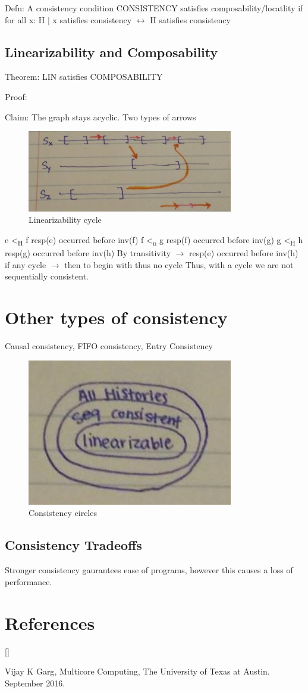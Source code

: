 \documentclass[twoside]{article}
\def\beginrefs{\begin{list}%
        {[\arabic{equation}]}{\usecounter{equation}
         \setlength{\leftmargin}{2.0truecm}\setlength{\labelsep}{0.4truecm}%
         \setlength{\labelwidth}{1.6truecm}}}
\def\endrefs{\end{list}}
\def\bibentry#1{\item[\hbox{[#1]}]}
\begin{document}
Defn: A consistency condition CONSISTENCY satisfies composability/locatlity if for all x: H $\vert$ x satisfies consistency $\longleftrightarrow$ H satisfies consistency

\subsection{Linearizability and Composability}

Theorem: LIN satisfies COMPOSABILITY

Proof: 

Claim: The graph stays acyclic. Two types of arrows
\begin{figure}[ht!]
\centering
\includegraphics[width=90mm]{pic_12.jpg}
\caption{Linearizability cycle \label{overflow}}
\end{figure}
e \textless\textsubscript{H} f resp(e) occurred before inv(f)
f \textless\textsubscript{n} g resp(f) occurred before inv(g)
g \textless\textsubscript{H} h resp(g) occurred before inv(h)
By transitivity $\rightarrow$ resp(e) occurred before inv(h)
if any cycle $\rightarrow$ then to begin with thus no cycle
Thus, with a cycle we are not sequentially consistent.

\section{Other types of consistency}

Causal consistency,
FIFO consistency,
Entry Consistency
\begin{figure}[ht!]
\centering
\includegraphics[width=90mm]{pic_8.jpg}
\caption{Consistency circles \label{overflow}}
\end{figure}

\subsection{Consistency Tradeoffs}

Stronger consistency gaurantees ease of programs, however this causes a loss of performance.


\section*{References}
\beginrefs
\bibentry{1}{\sc Vijay K Garg}, Multicore Computing, The University of Texas at Austin. September
2016.

\endrefs
\end{document}
